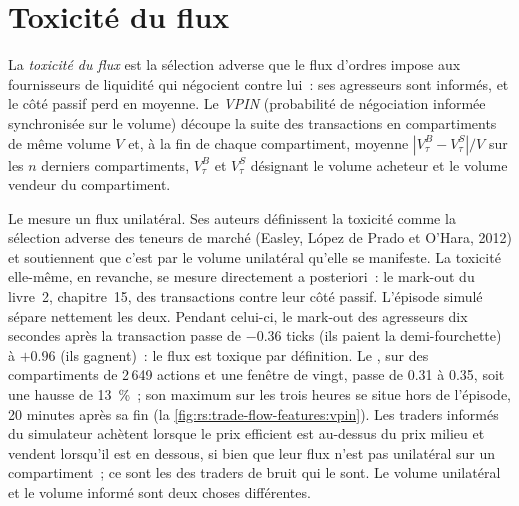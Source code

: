 \section{Toxicité du flux}

\begin{definition}\label{def:rs:trade-flow-features:vpin}
La \emph{toxicité du flux} est la sélection adverse que le flux d'ordres impose aux fournisseurs de liquidité qui négocient contre lui~:
ses agresseurs sont informés, et le côté passif perd en moyenne. Le \emph{VPIN} (probabilité de négociation informée synchronisée sur le
volume) découpe la suite des transactions en compartiments de même volume $V$ et, à la fin de chaque compartiment, moyenne $|V^B_\tau - V^S_\tau|/V$ sur
les $n$ derniers compartiments, $V^B_\tau$ et $V^S_\tau$ désignant le volume acheteur et le volume vendeur du compartiment.
\end{definition}

Le  mesure un flux unilatéral. Ses auteurs définissent la toxicité comme la sélection adverse des teneurs de marché (Easley, López de Prado et O'Hara,
2012) et soutiennent que c'est par le volume unilatéral qu'elle se manifeste. La toxicité elle-même, en revanche, se mesure directement a posteriori~: le mark-out
du livre~2, chapitre~15, des transactions contre leur côté passif. L'épisode simulé sépare nettement les deux. Pendant celui-ci, le
mark-out des agresseurs dix secondes après la transaction passe de $-0.36$ ticks (ils paient la demi-fourchette) à $+0.96$ (ils gagnent)~: le flux est toxique par
définition. Le , sur des compartiments de 2\,649 actions et une fenêtre de vingt, passe de 0.31 à 0.35, soit une hausse de 13~\%~; son maximum sur les trois heures
se situe hors de l'épisode, 20 minutes après sa fin (la \cref{fig:rs:trade-flow-features:vpin}). Les traders informés du simulateur achètent lorsque
le prix efficient est au-dessus du prix milieu et vendent lorsqu'il est en dessous, si bien que leur flux n'est pas unilatéral sur un compartiment~; ce sont les  des traders de bruit
qui le sont. Le volume unilatéral et le volume informé sont deux choses différentes.

